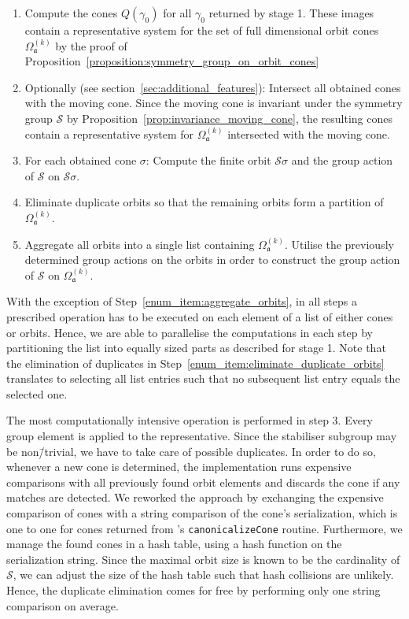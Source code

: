\begin{enumerate}
	\item Compute the cones $Q(\gamma_0)$ for all \afaces{} $\gamma_0$ returned by stage 1. These images contain a representative system for the set of full dimensional orbit cones $\Omega_\mathfrak{a}^{(k)}$ by the proof of Proposition~\ref{proposition:symmetry_group_on_orbit_cones}
	\item Optionally (see section~\ref{sec:additional_features}): Intersect all obtained cones with the moving cone. Since the moving cone is invariant under the symmetry group $\mathcal{S}$ by Proposition~\ref{prop:invariance_moving_cone}, the resulting cones contain a representative system for $\Omega_\mathfrak{a}^{(k)}$ intersected with the moving cone.
	\item For each obtained cone $\sigma$: Compute the finite orbit $\mathcal{S}\sigma$ and the group action of $\mathcal{S}$ on $\mathcal{S}\sigma$. \label{enum_item:compute_orbit_cone_orbits}
	\item Eliminate duplicate orbits so that the remaining orbits form a partition of $\Omega_\mathfrak{a}^{(k)}$. \label{enum_item:eliminate_duplicate_orbits}
	\item Aggregate all orbits into a single list containing $\Omega_\mathfrak{a}^{(k)}$. Utilise the previously determined group actions on the orbits in order to construct the group action of $\mathcal{S}$ on $\Omega_\mathfrak{a}^{(k)}$. \label{enum_item:aggregate_orbits}
\end{enumerate}

With the exception of Step~\ref{enum_item:aggregate_orbits}, in all steps a prescribed operation has to be executed on each element of a list of either cones or orbits. Hence, we are able to parallelise the computations in each step by partitioning the list into equally sized parts as described for stage 1. Note that the elimination of duplicates in Step~\ref{enum_item:eliminate_duplicate_orbits} translates to selecting all list entries such that no subsequent list entry equals the selected one.

The most computationally intensive operation is performed in step 3. Every group element is applied to the representative. Since the stabiliser subgroup may be non\=/trivial, we have to take care of possible duplicates. In order to do so, whenever a new cone is determined, the \gitfanlib{} implementation runs expensive comparisons with all previously found orbit elements and discards the cone if any matches are detected. We reworked the approach by
exchanging the expensive comparison of cones with a string comparison of the cone's serialization, which is one to one for cones returned from \singular's \texttt{canonicalizeCone} routine. Furthermore, we manage the found cones in a hash table, using a hash function on the serialization string. Since the maximal orbit size is known to be the cardinality of $\mathcal{S}$, we can adjust the size of the hash table such that hash collisions are unlikely. Hence, the duplicate elimination comes for free by performing only one string comparison on average.

